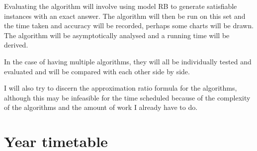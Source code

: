 \documentclass[11pt]{article}
\theoremstyle{definition}
\begin{document}
    Evaluating the algorithm will involve using model RB to generate satisfiable instances with an exact answer.
    The algorithm will then be run on this set and the time taken and accuracy will be recorded, perhaps some
    charts will be drawn. The algorithm will be asymptotically analysed and a running time will be derived. 

    In the case of having multiple algorithms, they will all be individually tested and evaluated and will be 
    compared with each other side by side.

    I will also try to discern the approximation ratio formula for the algorithms, although this may be infeasible
    for the time scheduled because of the complexity of the algorithms and the amount of work I already have to do.    
     
  \newpage

  \section{Year timetable}
    
\end{document}
